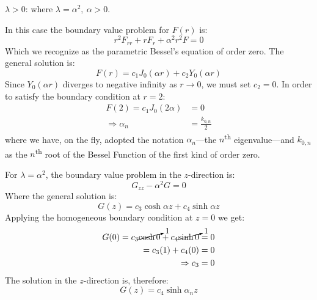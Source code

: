 \vspace{0.25cm}

\noindent\underline{$\lambda > 0$}: where $\lambda = \alpha^2, \ \alpha>0$.

\noindent In this case the boundary value problem for $F(r)$ is:
\begin{equation*}
r^2F_{rr}+rF_r+\alpha^2r^2F = 0
\end{equation*}
Which we recognize as the parametric Bessel's equation of order zero.  The general solution is:
\begin{equation*}
F(r) = c_1J_0(\alpha r) + c_2 Y_0(\alpha r)
\end{equation*}
Since $Y_0(\alpha r)$ diverges to negative infinity as $r \to 0$, we must set $c_2 = 0$.  In order to satisfy the boundary condition at $r=2$:
\begin{align*}
F(2) = c_1J_0(2 \alpha) &= 0 \\
\Rightarrow \alpha_n &= \frac{k_{0,n}}{2}
\end{align*}
where we have, on the fly, adopted the notation $\alpha_n$---the $n$\textsuperscript{th} eigenvalue---and $k_{0,n}$ as the $n$\textsuperscript{th} root of the Bessel Function of the first kind of order zero.

\vspace{0.25cm}

\noindent For $\lambda = \alpha^2$, the boundary value problem in the $z$-direction is:
\begin{equation*}
G_{zz}-\alpha^2G = 0
\end{equation*}
Where the general solution is:
\begin{equation*}
G(z) = c_3\cosh{\alpha z} + c_4\sinh{\alpha z}
\end{equation*}
Applying the homogeneous boundary condition at $z=0$ we get:
\begin{align*}
G(0) = c_3 \cancelto{1}{\cosh{0}} + c_4 \cancelto{1}{\sinh{0}} &= 0 \\
= c_3(1) + c_4(0) &= 0 \\
\Rightarrow c_3 &= 0
\end{align*}
The solution in the $z$-direction is, therefore:
\begin{equation*}
G(z) = c_4 \sinh{\alpha_n z}
\end{equation*}

\vspace{0.25cm}

